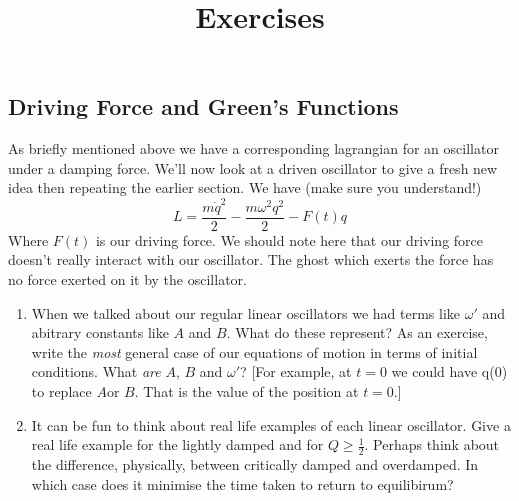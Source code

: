  \subsection{Driving Force and Green's Functions}
As briefly mentioned above we have a corresponding lagrangian for an oscillator under a damping force. We'll now look at a driven oscillator to give a fresh new idea then repeating the earlier section. We have (make sure you understand!)
\begin{equation}
L = \frac{m\dot{q}^{2}}{2} - \frac{m\omega^{2}q^{2}}{2} - F(t)q
\end{equation}
Where $F(t)$ is our driving force. We should note here that our driving force doesn't really interact with our oscillator. The ghost which exerts the force has no force exerted on it by the oscillator.



\title{Exercises}
\begin{enumerate}
\item When we talked about our regular linear oscillators we had terms like $\omega'$ and abitrary constants like $A$ and $B$. What do these represent? As an exercise, write the \textit{most} general case of our equations of motion in terms of initial conditions. What \textit{are} $A$, $B$ and $\omega'$?  [For example, at $t=0$ we could have q(0) to replace $A$or $B$. That is the value of the position at $t=0$.]
\item It can be fun to think about real life examples of each linear oscillator. Give a real life example for the lightly damped and for $Q \geq \frac {1}{2}$. Perhaps think about the difference, physically, between critically damped and overdamped.  In which case does it minimise the time taken to return to equilibirum? 
\end{enumerate}




